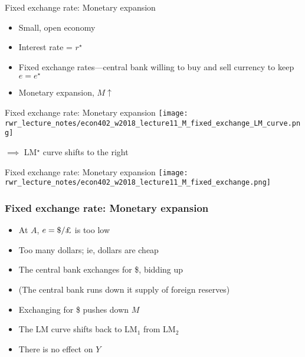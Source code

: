 \documentclass[presentation,dvipsnames]{beamer}
\renewcommand{\pounds}{\text{\textsterling}{ }}
\begin{document}
\begin{frame}[label=sec-6-2]{Fixed exchange rate: Monetary expansion}
\begin{itemize}[label={--}]
\item Small, open economy
\item Interest rate = $r^{\star}$
\item Fixed exchange rates---central bank willing to buy and sell currency to keep $e = e^{\star}$
\item Monetary expansion, $M \uparrow$
\end{itemize}
\end{frame}
\begin{frame}[label=sec-6-2]{Fixed exchange rate: Monetary expansion}
\texttt{[image: rwr\_lecture\_notes/econ402\_w2018\_lecture11\_M\_fixed\_exchange\_LM\_curve.png]}

$\implies$ LM$^{\star}$ curve shifts to the right

\end{frame}
\begin{frame}[label=sec-6-2]{Fixed exchange rate: Monetary expansion}
\texttt{[image: rwr\_lecture\_notes/econ402\_w2018\_lecture11\_M\_fixed\_exchange.png]}
\end{frame}
\begin{frame}
\frametitle{Fixed exchange rate: Monetary expansion}
\begin{itemize}[label={--}]
\item At $A$, $e = \$ / \pounds$ is too low
\item Too many dollars; ie, dollars are cheap
\item The central bank exchanges \pounds for \$, bidding up \pounds
\item (The central bank runs down it supply of foreign reserves)
\item Exchanging \pounds for \$ pushes down $M$
\item The LM curve shifts back to LM$_{1}$ from LM$_{2}$
\item \textcolor{RubineRed}{There is no effect on $Y$}
\end{itemize}
\end{frame}
\end{document}
